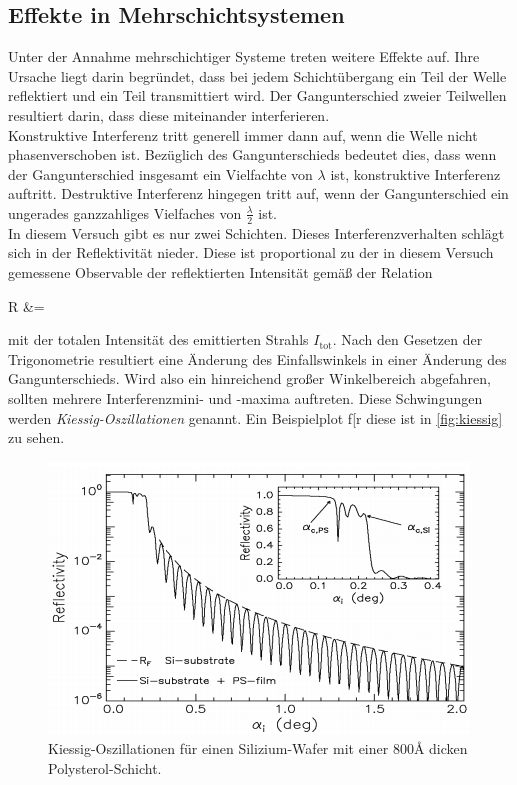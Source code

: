 \subsection{Effekte in Mehrschichtsystemen}
Unter der Annahme mehrschichtiger Systeme treten weitere Effekte auf. Ihre Ursache liegt darin begründet, dass bei jedem Schichtübergang ein Teil der Welle reflektiert und ein Teil transmittiert wird. Der Gangunterschied zweier Teilwellen resultiert darin, dass diese miteinander interferieren.\\
Konstruktive Interferenz tritt generell immer dann auf, wenn die Welle nicht phasenverschoben ist. Bezüglich des Gangunterschieds bedeutet dies, dass wenn der Gangunterschied insgesamt ein Vielfachte von $\lambda$ ist, konstruktive Interferenz auftritt. Destruktive Interferenz hingegen tritt auf, wenn der Gangunterschied ein ungerades ganzzahliges Vielfaches von $\frac{\lambda}{2}$ ist.\\
In diesem Versuch gibt es nur zwei Schichten. 
Dieses Interferenzverhalten schlägt sich in der Reflektivität nieder. Diese ist proportional zu der in diesem Versuch gemessene Observable der reflektierten Intensität gemäß der Relation 
\begin{aquation}
    R &= 
\end{aquation}
mit der totalen Intensität des emittierten Strahls $I_\text{tot}$. Nach den Gesetzen der Trigonometrie resultiert eine Änderung des Einfallswinkels in einer Änderung des Gangunterschieds. Wird also ein hinreichend großer Winkelbereich abgefahren, sollten mehrere Interferenzmini- und -maxima auftreten. Diese Schwingungen werden \textit{Kiessig-Oszillationen} genannt. Ein Beispielplot f[r diese ist in \autoref{fig:kiessig} zu sehen.
\begin{figure}
    \centering
    \includegraphics[width=\textwidth]{figures/kiessig.png}
    \caption{Kiessig-Oszillationen für einen Silizium-Wafer mit einer $800\si{\angstrom}$ dicken Polysterol-Schicht.}
    \label{fig:kiessig}
\end{figure} 

